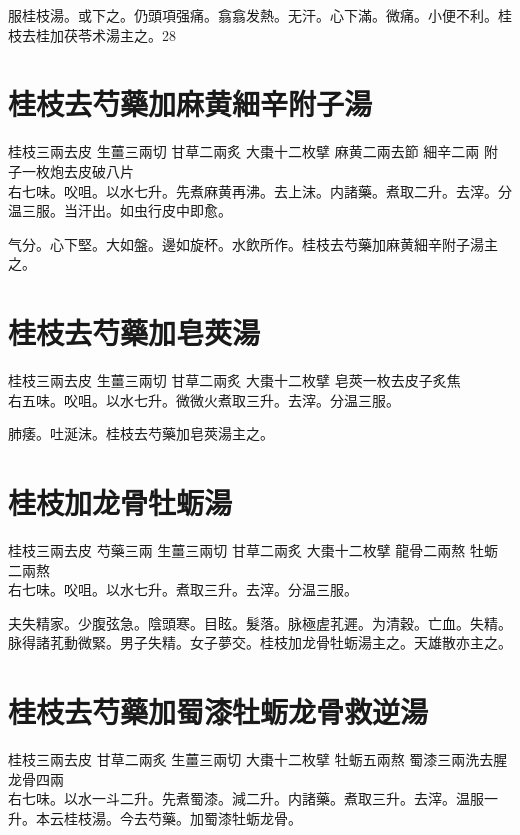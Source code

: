 服桂枝湯。{\khaaitp 或}下之。仍頭項强痛。翕翕发熱。无汗。心下滿。微痛。小便不利。桂枝去桂加茯苓术湯主之。28

\section{桂枝去芍藥加麻黄細辛附子湯}

桂枝{\scriptsize 三兩去皮} 生薑{\scriptsize 三兩切} 甘草{\scriptsize 二兩炙} 大棗{\scriptsize 十二枚擘} 麻黄{\scriptsize 二兩去節} 細辛{\scriptsize 二兩} 附子{\scriptsize 一枚炮去皮破八片}\\
右七味。㕮咀。以水七升。先煮麻黄再沸。去上沫。内諸藥。煮取二升。去滓。分温三服。当汗出。如虫行皮中即愈。

气分。心下堅。大如盤。邊如旋杯。水飲所作。桂枝去芍藥加麻黄細辛附子湯主之。

\section{桂枝去芍藥加皂莢湯}

桂枝{\scriptsize 三兩去皮} 生薑{\scriptsize 三兩切} 甘草{\scriptsize 二兩炙} 大棗{\scriptsize 十二枚擘} 皂莢{\scriptsize 一枚去皮子炙焦}\\
右五味。㕮咀。以水七升。微微火煮取三升。去滓。分温三服。

肺痿。吐涎沫。桂枝去芍藥加皂莢湯主之。

\section{桂枝加龙骨牡蛎湯}

桂枝{\scriptsize 三兩去皮} 芍藥{\scriptsize 三兩} 生薑{\scriptsize 三兩切} 甘草{\scriptsize 二兩炙} 大棗{\scriptsize 十二枚擘} 龍骨{\scriptsize 二兩熬} 牡蛎{\scriptsize 二兩熬}\\
右七味。㕮咀。以水七升。煮取三升。去滓。分温三服。

夫失精家。少腹弦急。陰頭寒。目眩。髮落。脉極虗芤遲。为清穀。亡血。失精。脉得諸芤動微緊。男子失精。女子夢交。桂枝加龙骨牡蛎湯主之。天雄散亦主之。

\section{桂枝去芍藥加蜀漆牡蛎龙骨救逆湯}

桂枝{\scriptsize 三兩去皮} 甘草{\scriptsize 二兩炙} 生薑{\scriptsize 三兩切} 大棗{\scriptsize 十二枚擘} 牡蛎{\scriptsize 五兩熬} 蜀漆{\scriptsize 三兩洗去腥} 龙骨{\scriptsize 四兩}\\
右七味。以水一斗二升。先煮蜀漆。減二升。内諸藥。煮取三升。去滓。温服一升。本云桂枝湯。今去芍藥。加蜀漆牡蛎龙骨。

